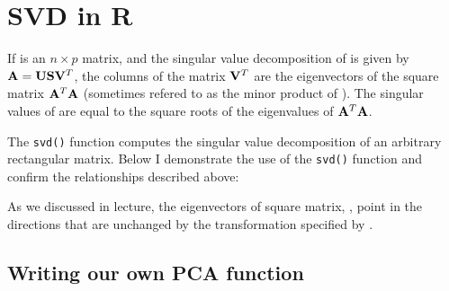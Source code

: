 
\section{SVD in R}

If  is an $n \times p$ matrix, and the singular value decomposition of  is given by $\mathbf{A} = \mathbf{U} \mathbf{S} \mathbf{V}^T$, the columns of the  matrix $\mathbf{V}^T$ are the eigenvectors of the square matrix $\mathbf{A}^T \mathbf{A}$ (sometimes refered to  as the minor product of ). The singular values of  are equal to the square roots of the eigenvalues of $\mathbf{A}^T \mathbf{A}$.

The \verb|svd()| function computes the singular value decomposition of an arbitrary rectangular matrix. Below I demonstrate the use of the \verb|svd()| function and confirm the relationships described above:


As we discussed in lecture, the eigenvectors of square matrix, , point in the directions that are unchanged by the transformation specified by .

\subsection{Writing our own PCA function}

